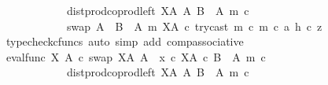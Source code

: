 \begin{isabellebody}
\ \ \ \ \ \ \ \ \ \ \ \ dist{\isacharunderscore}{\kern0pt}prod{\isacharunderscore}{\kern0pt}coprod{\isacharunderscore}{\kern0pt}left\ {\isacharparenleft}{\kern0pt}X\isactrlbsup A\isactrlesup {\isacharparenright}{\kern0pt}\ A\ {\isacharparenleft}{\kern0pt}B\ {\isasymsetminus}\ {\isacharparenleft}{\kern0pt}A{\isacharcomma}{\kern0pt}\ m{\isacharparenright}{\kern0pt}{\isacharparenright}{\kern0pt}\ {\isasymcirc}\isactrlsub c\isanewline
\ \ \ \ \ \ \ \ \ \ \ \ swap\ {\isacharparenleft}{\kern0pt}A\ {\isasymCoprod}\ {\isacharparenleft}{\kern0pt}B\ {\isasymsetminus}\ {\isacharparenleft}{\kern0pt}A{\isacharcomma}{\kern0pt}\ m{\isacharparenright}{\kern0pt}{\isacharparenright}{\kern0pt}{\isacharparenright}{\kern0pt}\ {\isacharparenleft}{\kern0pt}X\isactrlbsup A\isactrlesup {\isacharparenright}{\kern0pt}\ {\isasymcirc}\isactrlsub c\ {\isasymlangle}{\isacharparenleft}{\kern0pt}try{\isacharunderscore}{\kern0pt}cast\ m\ {\isasymcirc}\isactrlsub c\ m{\isacharparenright}{\kern0pt}\ {\isasymcirc}\isactrlsub c\ a{\isacharcomma}{\kern0pt}\ h\ {\isasymcirc}\isactrlsub c\ z{\isasymrangle}{\isachardoublequoteclose}\isanewline
\ \ \ \ \ \ \ \ \ \ \ \ \isamarkupfalse%
\ {\isacharparenleft}{\kern0pt}typecheck{\isacharunderscore}{\kern0pt}cfuncs{\isacharcomma}{\kern0pt}\ auto\ simp\ add{\isacharcolon}{\kern0pt}\ comp{\isacharunderscore}{\kern0pt}associative{}{\isacharparenright}{\kern0pt}\isanewline
\ \ \ \ \ \ \ \ \ \ \isamarkupfalse%
\ \isamarkupfalse%
\ {\isachardoublequoteopen}{\isacharparenleft}{\kern0pt}eval{\isacharunderscore}{\kern0pt}func\ X\ A\ {\isasymcirc}\isactrlsub c\ swap\ {\isacharparenleft}{\kern0pt}X\isactrlbsup A\isactrlesup {\isacharparenright}{\kern0pt}\ A{\isacharparenright}{\kern0pt}\ {\isasymamalg}\ {\isacharparenleft}{\kern0pt}x\ {\isasymcirc}\isactrlsub c\ {\isasymbeta}\isactrlbsub X\isactrlbsup A\isactrlesup \ {\isasymtimes}\isactrlsub c\ {\isacharparenleft}{\kern0pt}B\ {\isasymsetminus}\ {\isacharparenleft}{\kern0pt}A{\isacharcomma}{\kern0pt}\ m{\isacharparenright}{\kern0pt}{\isacharparenright}{\kern0pt}\isactrlesub {\isacharparenright}{\kern0pt}\ {\isasymcirc}\isactrlsub c\isanewline
\ \ \ \ \ \ \ \ \ \ \ \ dist{\isacharunderscore}{\kern0pt}prod{\isacharunderscore}{\kern0pt}coprod{\isacharunderscore}{\kern0pt}left\ {\isacharparenleft}{\kern0pt}X\isactrlbsup A\isactrlesup {\isacharparenright}{\kern0pt}\ A\ {\isacharparenleft}{\kern0pt}B\ {\isasymsetminus}\ {\isacharparenleft}{\kern0pt}A{\isacharcomma}{\kern0pt}\ m{\isacharparenright}{\kern0pt}{\isacharparenright}{\kern0pt}\ {\isasymcirc}\isactrlsub c\isanewline

\end{isabellebody}
